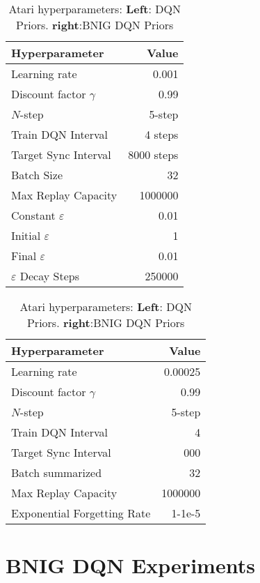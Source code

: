 {{\begin{table}[H]
    \centering
    \begin{tabular}{@{}lr@{}}
        \toprule
        Hyperparameter               & Value \\ \midrule
        Learning rate                & 0.001 \\
        Discount factor $\gamma$     & 0.99  \\
        $N$-step                     & 5-step \\
        Train DQN Interval           & 4 steps \\
        Target Sync Interval         & 8000 steps \\
        Batch Size                   & 32 \\
        Max Replay Capacity          & 1000000 \\ 
        Constant $\varepsilon$       & 0.01 \\ 
        Initial $\varepsilon$        & 1 \\
        Final $\varepsilon$          & 0.01 \\
        $\varepsilon$ Decay Steps    & 250000 \\ \bottomrule
    \end{tabular}
    \quad
    \begin{tabular}{@{}lr@{}}
        \toprule
        Hyperparameter               & Value \\ \midrule
        Learning rate                & 0.00025 \\
        Discount factor $\gamma$     & 0.99  \\
        $N$-step                     & 5-step \\
        Train DQN Interval           & 4 \\
        Target Sync Interval         & 000 \\
        Batch summarized             & 32 \\
        Max Replay Capacity          & 1000000 \\
        Exponential Forgetting Rate  & 1-1e-5 \\ \bottomrule
    \end{tabular}
    \caption{Atari hyperparameters: \textbf{Left}: DQN Priors. \textbf{right}:BNIG DQN Priors}
\end{table}

\clearpage
\section{BNIG DQN Experiments}


}}
